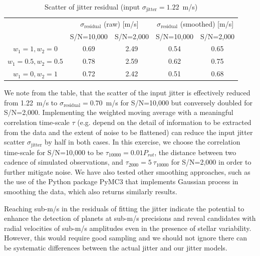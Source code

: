 \begin{table}[htbp]
\centering
\begin{tabular}{|c|c|c|c|c|}
\hline
\multirow{2}{*}{} 	& \multicolumn{2}{c|}{$\sigma_\text{residual}$ (raw) [m/s]}  & \multicolumn{2}{c|}{$\sigma_\text{residual}$ (smoothed) [m/s]}  \\ \cline{2-5} 
                  	& \multicolumn{1}{l|}{S/N=10,000} & \multicolumn{1}{l|}{S/N=2,000} & \multicolumn{1}{l|}{S/N=10,000} & \multicolumn{1}{l|}{S/N=2,000} \\ \hline
$w_1=1, w_2=0$  	 	& 0.69 		& 2.49 			& 0.54 			& 0.65                              \\ \hline
$w_1=0.5, w_2=0.5$  & 0.78 		& 2.59			& 0.62			& 0.75                              \\ \hline
$w_1=0, w_2=1$      & 0.72		& 2.42			& 0.51 			& 0.68                              \\ \hline
\end{tabular}
\caption{Scatter of jitter residual (input $\sigma_\text{jitter} = 1.22$~m/s)}
\label{table:jitter_model_scatter}
\end{table}

We note from the table, that the scatter of the input jitter is effectively reduced from 1.22~m/s to $\sigma_\text{residual} = 0.70$~m/s for S/N=10,000 but conversely doubled for S/N=2,000. Implementing the weighted moving average with a meaningful correlation time-scale $\tau$ (e.g. depend on the detail of information to be extracted from the data and the extent of noise to be flattened) can reduce the input jitter scatter $\sigma_\text{jitter}$ by half in both cases. In this exercise, we choose the correlation time-scale for S/N=10,000 to be $\tau_{10000} = 0.01 P_{rot}$, the distance between two cadence of simulated observations, and $\tau_{2000} = 5~\tau_{10000}$ for S/N=2,000 in order to further mitigate noise. We have also tested other smoothing approaches, such as the use of the Python package PyMC3 that implements Gaussian process in smoothing the data, which also returns similarly results. 

Reaching sub-m/s in the residuals of fitting the jitter indicate the potential to enhance the detection of planets at sub-m/s precisions and reveal candidates with radial velocities of sub-m/s amplitudes even in the presence of stellar variability. However, this would require good sampling and we should not ignore there can be systematic differences between the actual jitter and our jitter models.

